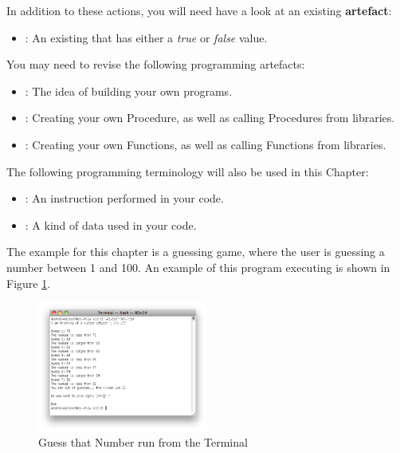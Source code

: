In addition to these actions, you will need have a look at an existing \textbf{artefact}:
\begin{itemize}
  \item {}: An existing  that has either a \emph{true} or \emph{false} value.
\end{itemize}

\bigskip

You may need to revise the following programming artefacts:
\begin{itemize}
  \item {}: The idea of building your own programs.
  \item {}: Creating your own Procedure, as well as calling Procedures from libraries.
  \item {}: Creating your own Functions, as well as calling Functions from libraries.
\end{itemize}

The following programming terminology will also be used in this Chapter:
\begin{itemize}
  \item {}: An instruction performed in your code.
  \item {}: A kind of data used in your code.
\end{itemize}

The example for this chapter is a guessing game, where the user is guessing a number between 1 and 100. An example of this program executing is shown in Figure \ref{fig:control-flow-guess-num}.

\begin{figure}[h]
   \centering
   \includegraphics[width=0.5\textwidth]{./topics/control-flow/images/GuessThatNumber} 
   \caption[Guess That Number Terminal]{Guess that Number run from the Terminal}
   \label{fig:control-flow-guess-num}
\end{figure}

